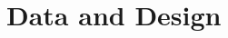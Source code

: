 \documentclass[12pt,english]{article}
\begin{document}






\section{Data and Design\label{sec:data}}
\end{document}
